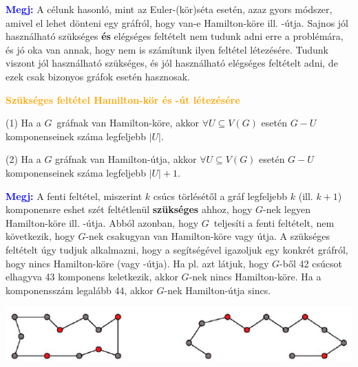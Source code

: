 \documentclass[../szamtud.tex]{subfiles}
\begin{document}
        \textcolor{blue}{\textbf{Megj:}} A célunk hasonló, mint az Euler-(kör)séta esetén, azaz gyors módszer, amivel el lehet dönteni egy gráfról, hogy van-e Hamilton-köre ill. -útja. Sajnos jól használható szükséges \textbf{és} elégséges feltételt nem tudunk adni erre a problémára, és jó oka van annak, hogy nem is számítunk ilyen feltétel létezésére. Tudunk viszont jól használható szükséges, és jól használható elégséges feltételt adni, de ezek csak bizonyos gráfok esetén hasznosak.
        
        \textcolor{orange}{\textbf{Szükséges feltétel Hamilton-kör és -út létezésére}}

        (1) Ha a $G$ gráfnak van Hamilton-köre, akkor $\forall U \subseteq V(G)$ esetén $G-U$ komponenseinek száma legfeljebb $|U|$.

        (2) Ha a $G$ gráfnak van Hamilton-útja, akkor $\forall U \subseteq V(G)$ esetén $G-U$ komponenseinek száma legfeljebb $|U|+1$. 

        \textcolor{blue}{\textbf{Megj:}} A fenti feltétel, miszerint $k$ csúcs törlésétől a gráf legfeljebb $k$ (ill. $k+1$) komponensre eshet szét feltétlenül \textbf{szükséges} ahhoz, hogy $G$-nek legyen Hamilton-köre ill. -útja. Abból azonban, hogy $G$ teljesíti a fenti feltételt, nem következik, hogy $G$-nek csakugyan van Hamilton-köre vagy útja. A szükséges feltételt úgy tudjuk alkalmazni, hogy a segítségével igazoljuk egy konkrét gráfról, hogy nincs Hamilton-köre (vagy -útja). Ha pl. azt látjuk, hogy $G$-ből 42 csúcsot elhagyva 43 komponens keletkezik, akkor $G$-nek nincs Hamilton-köre. Ha a komponensszám legalább 44, akkor $G$-nek Hamilton-útja sincs.
        

        \includegraphics[width=\textwidth]{./img/4.png}
\end{document}

